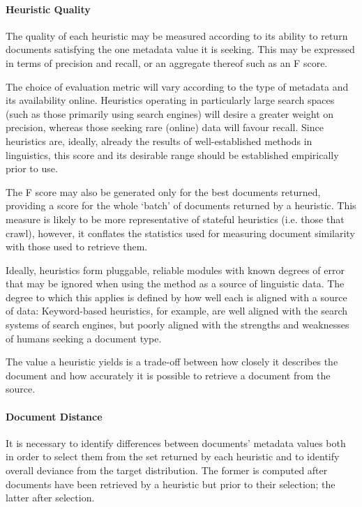 \paragraph{Heuristic Quality}
The quality of each heuristic may be measured according to its ability to return documents satisfying the one metadata value it is seeking.  This may be expressed in terms of precision and recall, or an aggregate thereof such as an F score.

The choice of evaluation metric will vary according to the type of metadata and its availability online.  Heuristics operating in particularly large search spaces (such as those primarily using search engines) will desire a greater weight on precision, whereas those seeking rare (online) data will favour recall.  Since heuristics are, ideally, already the results of well-established methods in linguistics, this score and its desirable range should be established empirically prior to use.

The F score may also be generated only for the best documents returned, providing a score for the whole `batch' of documents returned by a heuristic.  This measure is likely to be more representative of stateful heuristics (i.e. those that crawl), however, it conflates the statistics used for measuring document similarity with those used to retrieve them.

Ideally, heuristics form pluggable, reliable modules with known degrees of error that may be ignored when using the method as a source of linguistic data.  The degree to which this applies is defined by how well each is aligned with a source of data: Keyword-based heuristics, for example, are well aligned with the search systems of search engines, but poorly aligned with the strengths and weaknesses of humans seeking a document type.

The value a heuristic yields is a trade-off between how closely it describes the document and how accurately it is possible to retrieve a document from the source. 


\paragraph{Document Distance}
It is necessary to identify differences between documents' metadata values both in order to select them from the set returned by each heuristic and to identify overall deviance from the target distribution.  The former is computed after documents have been retrieved by a heuristic but prior to their selection; the latter after selection.


